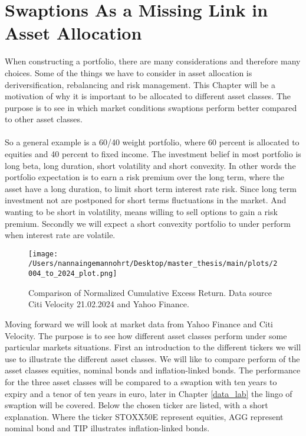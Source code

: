 \section{Swaptions As a Missing Link in Asset Allocation}
When constructing a portfolio, there are many considerations and therefore many choices. 
Some of the things we have to consider in asset allocation is deriversification, rebalancing 
and risk management. This Chapter will be a motivation of why it is important to be 
allocated to different asset classes. The purpose is to see in which market conditions
swaptions perform better compared to other asset classes.
\\\\
So a general  example is a 60/40 weight portfolio, where 60 percent is allocated to equities 
and 40 percent to fixed income. 
The investment belief in most portfolio is long beta, long duration, short volatility and short 
convexity. In other words the portfolio expectation is to earn a risk premium over the long term, 
where the asset have a long duration, to limit  short term interest rate risk. 
Since long term investment not are postponed for short terms fluctuations in the market. 
And wanting to be short in
volatility, means willing to sell options to gain a risk premium. Secondly we will expect 
a short convexity portfolio to under perform when interest rate are volatile. 
\begin{figure}[H]
    \centering
    \texttt{[image: /Users/nannaingemannohrt/Desktop/master\_thesis/main/plots/2004\_to\_2024\_plot.png]}
    \caption{Comparison of Normalized Cumulative Excess Return. Data source Citi Velocity 21.02.2024 
    and Yahoo Finance.}
    \label{fig:2004_2024}
\end{figure}
\noindent
Moving forward we will look at market data from Yahoo Finance and Citi Velocity. 
The purpose is to see how different asset classes perform under some particular markets situations.
First an introduction to the different tickers we will use to illustrate the different asset classes. 
We will like to compare perform of the asset classes equities, nominal bonds and inflation-linked bonds. 
The performance for the three asset classes will be compared to a swaption with ten years to expiry and a tenor
of ten years in euro, later in Chapter \ref{data_lab} the lingo of swaption will be covered. 
Below the chosen ticker are listed, with a short explanation. Where the ticker STOXX50E represent equities, 
AGG represent nominal bond and TIP illustrates inflation-linked bonds.

